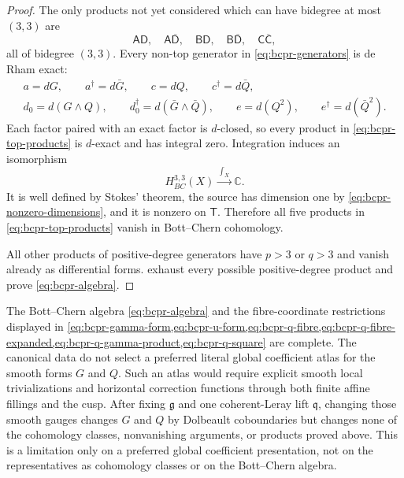 \begin{proof}
The only products not yet considered which can have bidegree at most
$(3,3)$ are
\begin{equation}
 \mathsf A\mathsf D,\quad
 \mathsf A\overline{\mathsf D},\quad
 \mathsf B\mathsf D,\quad
 \mathsf B\overline{\mathsf D},\quad
 \mathsf C\overline{\mathsf C},
\label{eq:bcpr-top-products}
\end{equation}
all of bidegree $(3,3)$.  Every non-top generator in
\cref{eq:bcpr-generators} is de Rham exact:
\begin{equation}
\begin{gathered}
 a=dG,\qquad a^\dagger=d\bar G,\qquad
 c=dQ,\qquad c^\dagger=d\bar Q,\\
 d_0=d(G\wedge Q),\qquad
 d_0^\dagger=d(\bar G\wedge\bar Q),\qquad
 e=d(Q^2),\qquad e^\dagger=d(\bar Q^2).
\end{gathered}
\label{eq:bcpr-de-rham-primitives}
\end{equation}
Each factor paired with an exact factor is $d$-closed, so every product in
\cref{eq:bcpr-top-products} is $d$-exact and has integral zero.  Integration
induces an isomorphism
\begin{equation}
 H^{3,3}_{BC}(X)\xrightarrow{\ \int_X\ }\mathbb C.
\label{eq:bcpr-top-integration}
\end{equation}
It is well defined by Stokes' theorem, the source has dimension one by
\cref{eq:bcpr-nonzero-dimensions}, and it is nonzero on $\mathsf T$.
Therefore all five products in \cref{eq:bcpr-top-products} vanish in
Bott--Chern cohomology.

All other products of positive-degree generators have $p>3$ or $q>3$ and
vanish already as differential forms.
exhaust every possible positive-degree product
and prove \cref{eq:bcpr-algebra}.
\end{proof}

\begin{remark}
\label{rem:bcpr-global-gauge-boundary}
The Bott--Chern algebra \cref{eq:bcpr-algebra} and the fibre-coordinate
restrictions displayed in
\cref{eq:bcpr-gamma-form,eq:bcpr-u-form,eq:bcpr-q-fibre,eq:bcpr-q-fibre-expanded,eq:bcpr-q-gamma-product,eq:bcpr-q-square}
are complete.  The canonical data do not select a preferred literal global
coefficient atlas for the smooth forms $G$ and $Q$.  Such an atlas would
require explicit smooth local trivializations and horizontal correction
functions through both finite affine fillings and the cusp.  After fixing
$\mathfrak g$ and one coherent-Leray lift $\mathfrak q$, changing those
smooth gauges changes $G$ and $Q$ by Dolbeault coboundaries but changes
none of the cohomology classes, nonvanishing arguments, or products proved
above.  This is a limitation only on a preferred global coefficient
presentation, not on the representatives as cohomology classes or on the
Bott--Chern algebra.
\end{remark}

